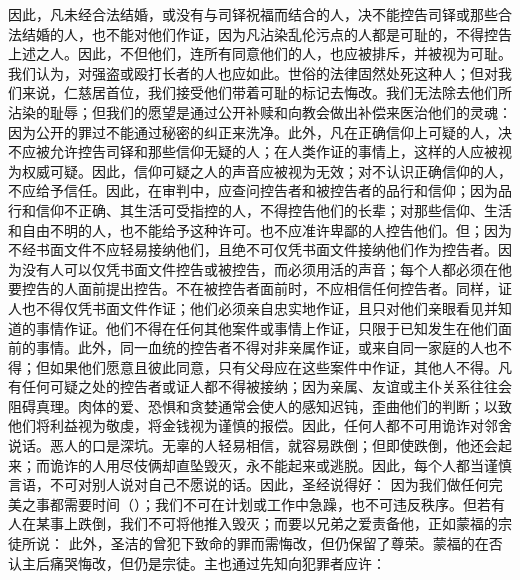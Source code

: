 因此，凡未经合法结婚，或没有与司铎祝福而结合的人，决不能控告司铎或那些合法结婚的人，也不能对他们作证，因为凡沾染乱伦污点的人都是可耻的，不得控告上述之人。因此，不但他们，连所有同意他们的人，也应被排斥，并被视为可耻。我们认为，对强盗或殴打长者的人也应如此。世俗的法律固然处死这种人；但对我们来说，仁慈居首位，我们接受他们带着可耻的标记去悔改。我们无法除去他们所沾染的耻辱；但我们的愿望是通过公开补赎和向教会做出补偿来医治他们的灵魂：因为公开的罪过不能通过秘密的纠正来洗净。此外，凡在正确信仰上可疑的人，决不应被允许控告司铎和那些信仰无疑的人；在人类作证的事情上，这样的人应被视为权威可疑。因此，信仰可疑之人的声音应被视为无效；对不认识正确信仰的人，不应给予信任。因此，在审判中，应查问控告者和被控告者的品行和信仰；因为品行和信仰不正确、其生活可受指控的人，不得控告他们的长辈；对那些信仰、生活和自由不明的人，也不能给予这种许可。也不应准许卑鄙的人控告他们。但；因为不经书面文件不应轻易接纳他们，且绝不可仅凭书面文件接纳他们作为控告者。因为没有人可以仅凭书面文件控告或被控告，而必须用活的声音；每个人都必须在他要控告的人面前提出控告。不在被控告者面前时，不应相信任何控告者。同样，证人也不得仅凭书面文件作证；他们必须亲自忠实地作证，且只对他们亲眼看见并知道的事情作证。他们不得在任何其他案件或事情上作证，只限于已知发生在他们面前的事情。此外，同一血统的控告者不得对非亲属作证，或来自同一家庭的人也不得；但如果他们愿意且彼此同意，只有父母应在这些案件中作证，其他人不得。凡有任何可疑之处的控告者或证人都不得被接纳；因为亲属、友谊或主仆关系往往会阻碍真理。肉体的爱、恐惧和贪婪通常会使人的感知迟钝，歪曲他们的判断；以致他们将利益视为敬虔，将金钱视为谨慎的报偿。因此，任何人都不可用诡诈对邻舍说话。恶人的口是深坑。无辜的人轻易相信，就容易跌倒；但即使跌倒，他还会起来；而诡诈的人用尽伎俩却直坠毁灭，永不能起来或逃脱。因此，每个人都当谨慎言语，不可对别人说对自己不愿说的话。因此，圣经说得好：  因为我们做任何完美之事都需要时间（）；我们不可在计划或工作中急躁，也不可违反秩序。但若有人在某事上跌倒，我们不可将他推入毁灭；而要以兄弟之爱责备他，正如蒙福的宗徒所说： 此外，圣洁的曾犯下致命的罪而需悔改，但仍保留了尊荣。蒙福的在否认主后痛哭悔改，但仍是宗徒。主也通过先知向犯罪者应许： \par

